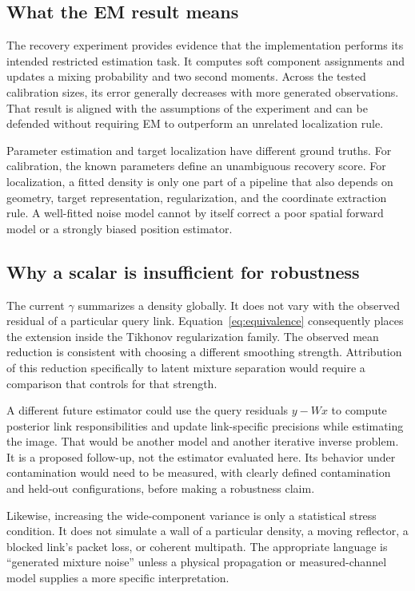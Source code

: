 \documentclass[conference,letterpaper]{IEEEtran}
\begin{document}
\subsection{What the EM result means}
The recovery experiment provides evidence that the implementation performs its intended restricted estimation task. It computes soft component assignments and updates a mixing probability and two second moments. Across the tested calibration sizes, its error generally decreases with more generated observations. That result is aligned with the assumptions of the experiment and can be defended without requiring EM to outperform an unrelated localization rule.

Parameter estimation and target localization have different ground truths. For calibration, the known parameters define an unambiguous recovery score. For localization, a fitted density is only one part of a pipeline that also depends on geometry, target representation, regularization, and the coordinate extraction rule. A well-fitted noise model cannot by itself correct a poor spatial forward model or a strongly biased position estimator.

\subsection{Why a scalar is insufficient for robustness}
The current $\gamma$ summarizes a density globally. It does not vary with the observed residual of a particular query link. Equation~\eqref{eq:equivalence} consequently places the extension inside the Tikhonov regularization family. The observed mean reduction is consistent with choosing a different smoothing strength. Attribution of this reduction specifically to latent mixture separation would require a comparison that controls for that strength.

A different future estimator could use the query residuals $y-Wx$ to compute posterior link responsibilities and update link-specific precisions while estimating the image. That would be another model and another iterative inverse problem. It is a proposed follow-up, not the estimator evaluated here. Its behavior under contamination would need to be measured, with clearly defined contamination and held-out configurations, before making a robustness claim.

Likewise, increasing the wide-component variance is only a statistical stress condition. It does not simulate a wall of a particular density, a moving reflector, a blocked link's packet loss, or coherent multipath. The appropriate language is ``generated mixture noise'' unless a physical propagation or measured-channel model supplies a more specific interpretation.
\end{document}
